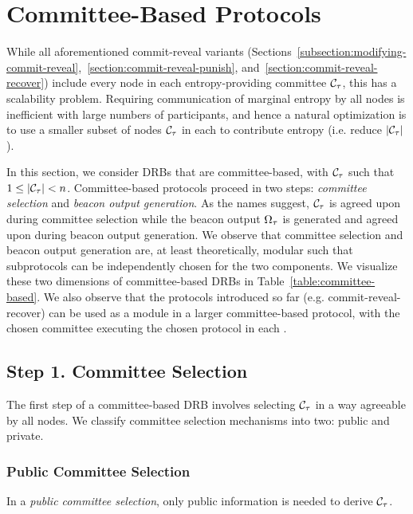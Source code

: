 
\section{Committee-Based Protocols}
\label{section:committee-based}
While all aforementioned commit-reveal variants (Sections~\ref{subsection:modifying-commit-reveal},~\ref{section:commit-reveal-punish}, and~\ref{section:commit-reveal-recover}) include every node in each entropy-providing committee $\mathcal{C}_\tau$, this has a scalability problem.
Requiring communication of marginal entropy by all nodes is inefficient with large numbers of participants, and hence a natural optimization is to use a smaller subset of nodes $\mathcal{C}_\tau$ in each \epoch to contribute entropy (i.e. reduce $|\mathcal{C}_\tau|$).

In this section, we consider DRBs that are committee-based, with $\mathcal{C}_\tau$ such that $1 \leq |\mathcal{C}_\tau| < n$. Committee-based protocols proceed in two steps: \textit{committee selection} and \textit{beacon output generation}. As the names suggest, $\mathcal{C}_\tau$ is agreed upon during committee selection while the beacon output $\Omega_\tau$ is generated and agreed upon during beacon output generation.
We observe that committee selection and beacon output generation are, at least theoretically, modular such that subprotocols can be independently chosen for the two components. We visualize these two dimensions of committee-based DRBs in Table~\ref{table:committee-based}. We also observe that the protocols introduced so far (e.g. commit-reveal-recover) can be used as a module in a larger committee-based protocol, with the chosen committee executing the chosen protocol in each \epoch.

\subsection{Step 1. Committee Selection}
The first step of a committee-based DRB involves selecting $\mathcal{C}_\tau$ in a way agreeable by all nodes. We classify committee selection mechanisms into two: public and private.

\subsubsection{Public Committee Selection}
\label{subsubsection:public-committee-selection}
In a \textit{public committee selection}, only public information is needed to derive $\mathcal{C}_\tau$.

